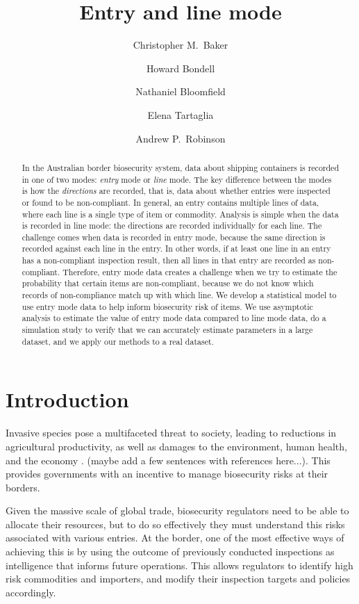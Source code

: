 \documentclass{article}
\title{Entry and line mode}
\author{Christopher M.\ Baker \and Howard Bondell \and Nathaniel Bloomfield \and Elena Tartaglia \and Andrew P.\ Robinson}
\begin{document}
  
\maketitle
\begin{abstract}
In the Australian border biosecurity system, data about shipping containers is recorded in one of two modes: \emph{entry} mode or \emph{line} mode. The key difference between the modes is how the \emph{directions} are recorded, that is, data about whether entries were inspected or found to be non-compliant. In general, an entry contains multiple lines of data, where each line is a single type of item or commodity. Analysis is simple when the data is recorded in line mode: the directions are recorded individually for each line. The challenge comes when data is recorded in entry mode, because the same direction is recorded against each line in the entry. In other words, if at least one line in an entry has a non-compliant inspection result, then all lines in that entry are recorded as non-compliant. Therefore, entry mode data creates a challenge when we try to estimate the probability that certain items are non-compliant, because we do not know which records of non-compliance match up with which line. We develop a statistical model to use entry mode data to help inform biosecurity risk of items. We use asymptotic analysis to estimate the value of entry mode data compared to line mode data, do a simulation study to verify that we can accurately estimate parameters in a large dataset, and we apply our methods to a real dataset. 
\end{abstract}

\section{Introduction}

Invasive species pose a multifaceted threat to society, leading to reductions in agricultural productivity, as well as damages to the environment, human health, and the economy \citep{rai2020invasive}. (maybe add a few sentences with references here...). This provides governments with an incentive to manage biosecurity risks at their borders. 

Given the massive scale of global trade, biosecurity regulators need to be able to allocate their resources, but to do so effectively they must understand this risks associated with various entries. At the border, one of the most effective ways of achieving this is by using the outcome of previously conducted inspections as intelligence that informs future operations. This allows regulators to identify high risk commodities and importers, and modify their inspection targets and policies accordingly.
\end{document}
